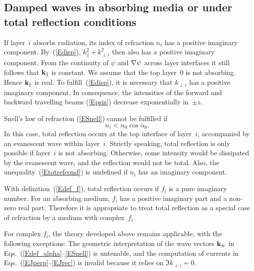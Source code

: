 \subsection{Damped waves in absorbing media
  or under total reflection conditions}\label{s:complex}

If layer~$i$ absorbs radiation,
its index of refraction $n_i$ has a positive imaginary component.
By~(\ref{Edisp}),
$k_\parallel^2+k_{\perp i}^2$ then also has a positive imaginary component.
From the continuity of $\psi$ and $\mathbf{\nabla}\psi$ across layer interfaces
it still follows that $\mathbf{k}_\parallel$ is constant.
We assume that the top layer~0 is not absorbing.
Hence $\mathbf{k}_\parallel$ is real.
To fulfill~(\ref{Edisp}),
it is necessary that $k_{\perp i}$
has a positive imaginary component.
In consequence,
the intensities of the forward and backward travelling beams (\ref{Epsiz})
decrease exponentially in~$\pm z$.

Snell's law of refraction (\ref{ESnell})
cannot be fulfilled if
\begin{equation}\label{Etotrefcond}
  n_i<n_0\cos\alpha_0.  
\end{equation}
In this case, total reflection occurs at the top interface of layer~$i$,
accompanied by an evanescent wave within layer~$i$.
Strictly speaking,
total reflection is only possible if layer~$i$ is not absorbing.
Otherwise, some intensity would be dissipated by the evanescent wave,
and the reflection would not be total.
Also, the unequality~(\ref{Etotrefcond}) is undefined
if $n_i$ has an imaginary component.

With definition~(\ref{Edef_f}),
total reflection occurs if $f_i$ is a pure imaginary number.
For an absorbing medium, $f_i$ has a positive imaginary part
and a non-zero real part.
Therefore it is appropriate to treat total reflection as a special
case of refraction by a medium with complex~$f_i$.

For complex $f_i$,
the theory developed above
remains applicable, with the following exceptions:
The geometric interpretation of the wave vectors $\mathbf{k}_\pm$
in Eqs.~(\ref{Edef_alpha}--\ref{ESnell}) is untenable,
and the computation of currents in
Eqs.~(\ref{EJperp}--\ref{EJrec}) is invalid because it
relies on $\Im k_{\perp i}=0$.


